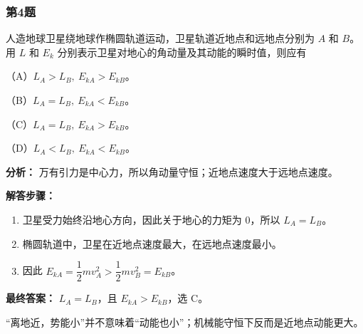 \documentclass[12pt,a4paper]{ctexart}
\begin{document}
\subsubsection*{第4题}
\begin{tcolorbox}[colback=gray!2!white,colframe=black!60,title={题目}]
人造地球卫星绕地球作椭圆轨道运动，卫星轨道近地点和远地点分别为 \(A\) 和 \(B\)。用 \(L\) 和 \(E_k\) 分别表示卫星对地心的角动量及其动能的瞬时值，则应有\par
（A）\(L_A>L_B,\ E_{kA}>E_{kB}\)。\par
（B）\(L_A=L_B,\ E_{kA}<E_{kB}\)。\par
（C）\(L_A=L_B,\ E_{kA}>E_{kB}\)。\par
（D）\(L_A<L_B,\ E_{kA}<E_{kB}\)。\par
\end{tcolorbox}
\begin{tcolorbox}[colback=blue!2!white,colframe=blue!55!black,title={完整答案}]
\textbf{分析：}
万有引力是中心力，所以角动量守恒；近地点速度大于远地点速度。\par
\textbf{解答步骤：}
\begin{enumerate}
\item 卫星受力始终沿地心方向，因此关于地心的力矩为 0，所以 \(L_A=L_B\)。
\item 椭圆轨道中，卫星在近地点速度最大，在远地点速度最小。
\item 因此 \(E_{kA}=\dfrac12 mv_A^2>\dfrac12 mv_B^2=E_{kB}\)。
\end{enumerate}
\textbf{最终答案：}
\(L_A=L_B\)，且 \(E_{kA}>E_{kB}\)，选 C。\par
\end{tcolorbox}
\begin{tcolorbox}[colback=red!2!white,colframe=red!55!black,title={易错点}]
“离地近，势能小”并不意味着“动能也小”；机械能守恒下反而是近地点动能更大。\par
\end{tcolorbox}
\end{document}
